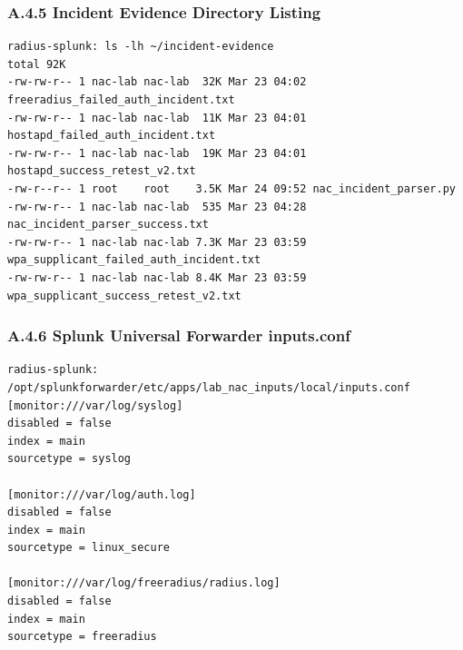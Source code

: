 \documentclass[11pt]{article}
\begin{document}

\subsubsection{A.4.5 Incident Evidence Directory Listing}
\label{sec:appendix-a-incident-evidence-directory-listing}

\begin{verbatim}
radius-splunk: ls -lh ~/incident-evidence
total 92K
-rw-rw-r-- 1 nac-lab nac-lab  32K Mar 23 04:02 freeradius_failed_auth_incident.txt
-rw-rw-r-- 1 nac-lab nac-lab  11K Mar 23 04:01 hostapd_failed_auth_incident.txt
-rw-rw-r-- 1 nac-lab nac-lab  19K Mar 23 04:01 hostapd_success_retest_v2.txt
-rw-r--r-- 1 root    root    3.5K Mar 24 09:52 nac_incident_parser.py
-rw-rw-r-- 1 nac-lab nac-lab  535 Mar 23 04:28 nac_incident_parser_success.txt
-rw-rw-r-- 1 nac-lab nac-lab 7.3K Mar 23 03:59 wpa_supplicant_failed_auth_incident.txt
-rw-rw-r-- 1 nac-lab nac-lab 8.4K Mar 23 03:59 wpa_supplicant_success_retest_v2.txt
\end{verbatim}


\subsubsection{A.4.6 Splunk Universal Forwarder inputs.conf}
\label{sec:appendix-a-splunk-uf-inputs-conf}

\begin{verbatim}
radius-splunk: /opt/splunkforwarder/etc/apps/lab_nac_inputs/local/inputs.conf
[monitor:///var/log/syslog]
disabled = false
index = main
sourcetype = syslog

[monitor:///var/log/auth.log]
disabled = false
index = main
sourcetype = linux_secure

[monitor:///var/log/freeradius/radius.log]
disabled = false
index = main
sourcetype = freeradius
\end{verbatim}
\end{document}
